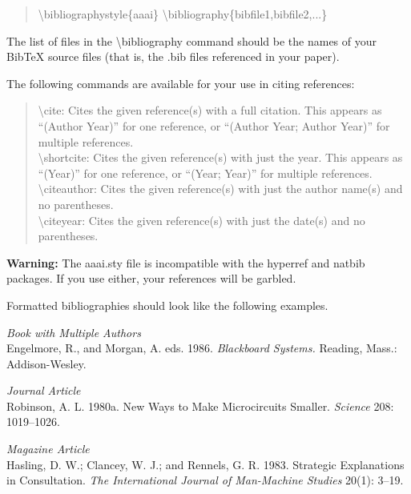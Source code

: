 \documentclass[letterpaper]{article}
\begin{document}
\begin{quote}
\begin{small}
\textbackslash bibliographystyle\{aaai\}
\textbackslash bibliography\{bibfile1,bibfile2,...\}
\end{small}
\end{quote}

The list of files in the \textbackslash  bibliography command should be the names of your BibTeX source files (that is, the .bib files referenced in your paper).

The following commands are available for your use in citing references:
\begin{quote}
\begin{small}
\textbackslash cite: Cites the given reference(s) with a full citation. This appears as ``(Author Year)'' for one reference, or ``(Author Year; Author Year)'' for multiple references.\\
\textbackslash shortcite: Cites the given reference(s) with just the year. This appears as ``(Year)'' for one reference, or ``(Year; Year)'' for multiple references.\\
\textbackslash citeauthor: Cites the given reference(s) with just the author name(s) and no parentheses.\\
\textbackslash citeyear: Cites the given reference(s) with just the date(s) and no parentheses.
\end{small}
\end{quote}

\textbf{Warning:} The aaai.sty file is incompatible with the hyperref and natbib packages. If you use either, your references will be garbled.

Formatted bibliographies should look like the following examples.

\smallskip \noindent \textit{Book with Multiple Authors}\\
Engelmore, R., and Morgan, A. eds. 1986. \textit{Blackboard Systems.} Reading, Mass.: Addison-Wesley.

\smallskip \noindent \textit{Journal Article}\\
Robinson, A. L. 1980a. New Ways to Make Microcircuits Smaller. \textit{Science} 208: 1019--1026.

\smallskip \noindent \textit{Magazine Article}\\
Hasling, D. W.; Clancey, W. J.; and Rennels, G. R. 1983. Strategic Explanations in Consultation. \textit{The International Journal of Man-Machine Studies} 20(1): 3--19.
\end{document}
